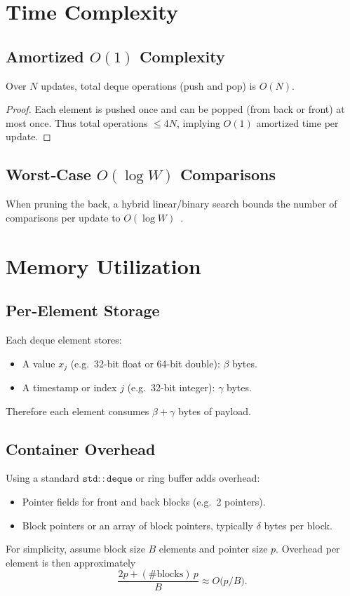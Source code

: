 \documentclass[12pt,letterpaper]{article}
\begin{document}
\section{Time Complexity}
\subsection{Amortized \(O(1)\) Complexity}
\begin{theorem}
Over \(N\) updates, total deque operations (push and pop) is \(O(N)\).
\end{theorem}
\begin{proof}
Each element is pushed once and can be popped (from back or front) at most once.  Thus total operations \(\le 4N\), implying \(O(1)\) amortized time per update.
\end{proof}

\subsection{Worst‐Case \(O(\log W)\) Comparisons}
When pruning the back, a hybrid linear/binary search bounds the number of comparisons per update to \(O(\log W)\)~\cite{Lemire2006}.

\section{Memory Utilization}
\subsection{Per‐Element Storage}
Each deque element stores:
\begin{itemize}
  \item A value \(x_j\) (e.g.\ 32-bit float or 64-bit double): \(\beta\) bytes.
  \item A timestamp or index \(j\) (e.g.\ 32-bit integer): \(\gamma\) bytes.
\end{itemize}
Therefore each element consumes \(\beta+\gamma\) bytes of payload.

\subsection{Container Overhead}
Using a standard \(\mathtt{std::deque}\) or ring buffer adds overhead:
\begin{itemize}
  \item Pointer fields for front and back blocks (e.g.\ 2 pointers).
  \item Block pointers or an array of block pointers, typically \(\delta\) bytes per block.
\end{itemize}
For simplicity, assume block size \(B\) elements and pointer size \(p\).  Overhead per element is then approximately
\[
\frac{2p + (\text{#blocks})\,p}{B}\approx O\!\bigl(p/B\bigr).
\]
\end{document}
